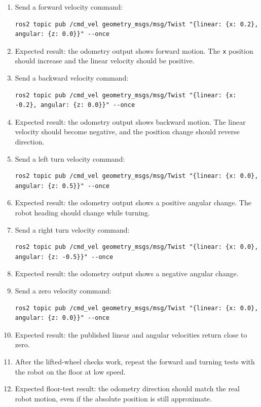 \documentclass[12pt]{article}
\begin{document}
\begin{enumerate}
    \begin{verbatim}
source ~/ros2_ws/install/setup.bash
    \end{verbatim}
    \item Send a forward velocity command:
    \begin{verbatim}
ros2 topic pub /cmd_vel geometry_msgs/msg/Twist "{linear: {x: 0.2}, angular: {z: 0.0}}" --once
    \end{verbatim}
    \item Expected result: the odometry output shows forward motion. The \texttt{x} position should increase and the linear velocity should be positive.
    \item Send a backward velocity command:
    \begin{verbatim}
ros2 topic pub /cmd_vel geometry_msgs/msg/Twist "{linear: {x: -0.2}, angular: {z: 0.0}}" --once
    \end{verbatim}
    \item Expected result: the odometry output shows backward motion. The linear velocity should become negative, and the position change should reverse direction.
    \item Send a left turn velocity command:
    \begin{verbatim}
ros2 topic pub /cmd_vel geometry_msgs/msg/Twist "{linear: {x: 0.0}, angular: {z: 0.5}}" --once
    \end{verbatim}
    \item Expected result: the odometry output shows a positive angular change. The robot heading should change while turning.
    \item Send a right turn velocity command:
    \begin{verbatim}
ros2 topic pub /cmd_vel geometry_msgs/msg/Twist "{linear: {x: 0.0}, angular: {z: -0.5}}" --once
    \end{verbatim}
    \item Expected result: the odometry output shows a negative angular change.
    \item Send a zero velocity command:
    \begin{verbatim}
ros2 topic pub /cmd_vel geometry_msgs/msg/Twist "{linear: {x: 0.0}, angular: {z: 0.0}}" --once
    \end{verbatim}
    \item Expected result: the published linear and angular velocities return close to zero.
    \item After the lifted-wheel checks work, repeat the forward and turning tests with the robot on the floor at low speed.
    \item Expected floor-test result: the odometry direction should match the real robot motion, even if the absolute position is still approximate.
\end{enumerate}
\end{document}
